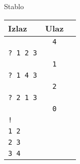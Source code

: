 \begin{statement}[
  problempoints=100,
  timelimit=1 sekunda,
  memorylimit=512 MiB,
]{Stablo}
{\renewcommand{\arraystretch}{1.4}
  \setlength{\tabcolsep}{6pt}
  \begin{tabular}{lcl}
    Izlaz & Ulaz\\ \midrule
    \texttt{} & \texttt{4} \\
    \texttt{\frenchspacing? 1 2 3} & \texttt{}  \\
    \texttt{ } & \texttt{1} \\
    \texttt{\frenchspacing? 1 4 3} & \texttt{} \\
    \texttt{ } & \texttt{2} \\
    \texttt{\frenchspacing? 2 1 3} & \texttt{} \\
    \texttt{ } & \texttt{0} \\    
    \texttt{\frenchspacing!} &\\
    \texttt{1 2} & \texttt{} \\
    \texttt{2 3} & \texttt{} \\
    \texttt{3 4} & \texttt{} \\
\end{tabular}}


\end{statement}

